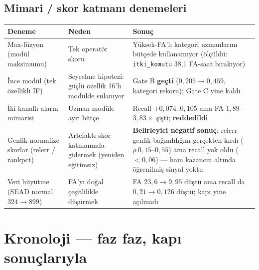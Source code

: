\documentclass[11pt,a4paper]{article}
\newcommand{\code}[1]{\texttt{\small #1}}
\newcommand{\gatefail}[1]{\textcolor{failred}{\textbf{#1}}}
\newcommand{\gatepass}[1]{\textcolor{okgreen}{\textbf{#1}}}
\begin{document}
\subsection{Mimari / skor katmanı denemeleri}

\begin{small}
\begin{longtable}{@{}p{}p{}p{}@{}}
\toprule
\textbf{Deneme} & \textbf{Neden} & \textbf{Sonuç} \\
\midrule
\endhead
Max-füzyon (modül maksimumu) &
Tek operatör skoru &
Yüksek-FA'lı kategori uzmanlarını bütçede kullanamıyor (ölçüldü:
\code{itki\_komutu} 38{,}1 FA-saat bırakıyor) \\
\addlinespace
İnce modül (tek özellikli IF) &
Seyrelme hipotezi: güçlü özellik 16'lı modülde sulanıyor &
Gate B \gatepass{geçti} ($0{,}205 \to 0{,}459$, kategori rekoru); Gate C yine
kaldı \\
\addlinespace
İki kanallı alarm mimarisi &
Uzman modüle ayrı bütçe &
Recall $+0{,}074..0{,}105$ ama FA $1{,}89$--$3{,}83\times$ şişti;
\gatefail{reddedildi} \\
\addlinespace
Genlik-normalize skorlar (relerr / rankpct) &
Artefaktı skor katmanında gidermek (yeniden eğitimsiz) &
\textbf{Belirleyici negatif sonuç}: relerr genlik bağımlılığını gerçekten kırdı
($\rho\ 0{,}15$--$0{,}55$) ama recall yok oldu ($<0{,}06$) --- ham kazancın altında
öğrenilmiş sinyal yoktu \\
\addlinespace
Veri büyütme (SEAD normal $324 \to 899$) &
FA'yı doğal çeşitlilikle düşürmek &
FA $23{,}6 \to 9{,}95$ düştü ama recall da $0{,}21 \to 0{,}126$ düştü; kapı yine
açılmadı \\
\bottomrule
\end{longtable}
\end{small}

\section{Kronoloji --- faz faz, kapı sonuçlarıyla}
\end{document}

